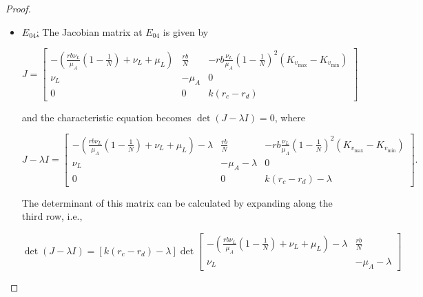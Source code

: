 \documentclass{article}
\theoremstyle{remark}
\theoremstyle{custom} %
\begin{document}
\begin{proof}
\begin{itemize}
The eigenvalue \(\lambda_1\) will be negative if and only if  $r_c - r_d > 0$. The eigenvalues \(\lambda_{2,3}\) will have negative real parts if and only if 

$$
\begin{aligned}
& \left(\frac{r b \nu_L}{\mu_A}\left(1-\frac{1}{{N}}\right)+\nu_L+\mu_L\right) \mu_A-\frac{r b \nu_L}{{N}}>0 \\
& \Leftrightarrow \quad\left(1-\frac{2}{{N}}\right)>-\frac{\left(\nu_L+\mu_L\right) \mu_A}{r b \nu_L} = \frac{1}{{N}} \\
\end{aligned}
$$


which is true if $N>1$ (the existence condition for $E_{03}$). Therefore, $E_{03}$ is LAS, confirming the stability conditions stated in item 3. Conversely, $E_{03}$ is unstable if $r_d-r_c>0$.




  \item \underline{$E_{04}$:} The Jacobian matrix at $E_{04}$ is given by



\[
J = \begin{bmatrix}
-\left(\frac{r b \nu_L}{\mu_A} \left(1 - \frac{1}{{N}}\right) + \nu_L + \mu_L\right) & \frac{r b}{{N}} & -r b \frac{\nu_L}{\mu_A} \left(1 - \frac{1}{{N}}\right)^2 \left(K_{v_{\max}} - K_{v_{\min}}\right) \\
\nu_L & -\mu_A & 0 \\
0 & 0 & k(r_c - r_d)
\end{bmatrix}
\]

and the characteristic equation becomes \(\det(J - \lambda I) = 0 \), where 


\[
J - \lambda I = \begin{bmatrix}
-\left(\frac{r b \nu_L}{\mu_A} \left(1 - \frac{1}{{N}}\right) + \nu_L + \mu_L\right) - \lambda & \frac{r b}{{N}} & -r b \frac{\nu_L}{\mu_A} \left(1 - \frac{1}{{N}}\right)^2 \left(K_{v_{\max}} - K_{v_{\min}}\right) \\
\nu_L & -\mu_A - \lambda & 0 \\
0 & 0 & k(r_c - r_d) - \lambda
\end{bmatrix}.
\]

The determinant of this matrix can be calculated by expanding along the third row, i.e.,

$$
\operatorname{det}(J-\lambda I)=[k(r_c - r_d)-\lambda] \operatorname{det}\left[\begin{array}{cc}
-\left(\frac{r b \nu_L}{\mu_A}\left(1-\frac{1}{{N}}\right)+\nu_L+\mu_L\right)-\lambda & \frac{r b}{{N}} \\
\nu_L & -\mu_A-\lambda
\end{array}\right]
$$
 

\end{itemize}
\end{proof}
\end{document}
